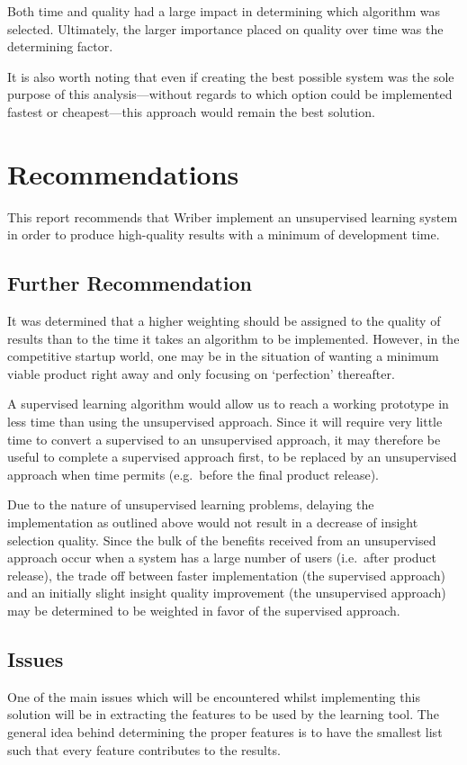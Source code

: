 \documentclass[12pt]{article}
\begin{document}
Both time and quality had a large impact in determining which algorithm was selected. Ultimately, the larger importance placed on quality over time was the determining factor.

It is also worth noting that even if creating the best possible system was the sole purpose of this analysis---without regards to which option could be implemented fastest or cheapest---this approach would remain the best solution.
\newpage


\section{Recommendations}
This report recommends that Wriber implement an unsupervised learning system in order to produce high-quality results with a minimum of development time.

\subsection{Further Recommendation}
It was determined that a higher weighting should be assigned to the quality of results than to the time it takes an algorithm to be implemented. However, in the competitive startup world, one may be in the situation of wanting a minimum viable product right away and only focusing on `perfection' thereafter.

A supervised learning algorithm would allow us to reach a working prototype in less time than using the unsupervised approach. Since it will require very little time to convert a supervised to an unsupervised approach, it may therefore be useful to complete a supervised approach first, to be replaced by an unsupervised approach when time permits (e.g.\ before the final product release).

Due to the nature of unsupervised learning problems, delaying the implementation as outlined above would not result in a decrease of insight selection quality. Since the bulk of the benefits received from an unsupervised approach occur when a system has a large number of users (i.e.\ after product release), the trade off between faster implementation (the supervised approach) and an initially slight insight quality improvement (the unsupervised approach) may be determined to be weighted in favor of the supervised approach.

\subsection{Issues}
One of the main issues which will be encountered whilst implementing this solution will be in extracting the features to be used by the learning tool. The general idea behind determining the proper features is to have the smallest list such that every feature contributes to the results.
\end{document}
